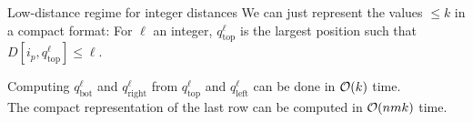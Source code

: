   \begin{frame}{Low-distance regime for integer distances}
  We can just represent the values $\leq k$ in a compact format:
  For $\ell$ an integer, $q_{\mathrm{top}}^\ell$ is the largest position such that $D[i_p,q_{\mathrm{top}}^\ell] \leq \ell$.
  \begin{center}
    
  \end{center}
  
  Computing $q_{\mathrm{bot}}^\ell$ and $q_{\mathrm{right}}^\ell$ from $q_{\mathrm{top}}^\ell$ and $q_{\mathrm{left}}^\ell$ can be done in $\mathcal{O}(k)$ time.\\
  The compact representation of the last row can be computed in $\mathcal{O}(nmk)$ time.
  \end{frame}    
      